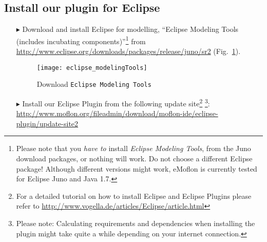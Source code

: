 \newpage
\genHeader
{}

\subsection{Install our plugin for Eclipse}
 
 \vspace{0.5cm}
 
\begin{itemize}
\item[$\blacktriangleright$] Download\hypertarget{installPlugin common}{} and install Eclipse for modelling, ``Eclipse Modeling Tools (includes incubating
components)''\footnote{Please note that you \emph{have to} install \emph{Eclipse Modeling Tools}, from the Juno download packages, or nothing will work.  Do not
choose a different Eclipse package!  Although different versions might work, eMoflon is currently tested for Eclipse Juno and Java 1.7.} from
\url{http://www.eclipse.org/downloads/packages/release/juno/sr2} (Fig.~\ref{fig_downloadModelingPackage}).

\vspace{1.5cm}

\begin{figure}[htbp]
	\centering
  	\texttt{[image: eclipse\_modelingTools]}
	\caption{Download \texttt{Eclipse Modeling Tools}}
	\label{fig_downloadModelingPackage}
\end{figure}

\vspace{1cm}

\item[$\blacktriangleright$] Install our Eclipse Plugin from the following update site\footnote{For a detailed tutorial on how to install Eclipse and Eclipse
Plugins please refer to \url{http://www.vogella.de/articles/Eclipse/article.html}} \footnote{Please note: Calculating requirements and dependencies when
installing the plugin might take quite a while depending on your internet connection.}:
\url{http://www.moflon.org/fileadmin/download/moflon-ide/eclipse-plugin/update-site2}

\end{itemize}
